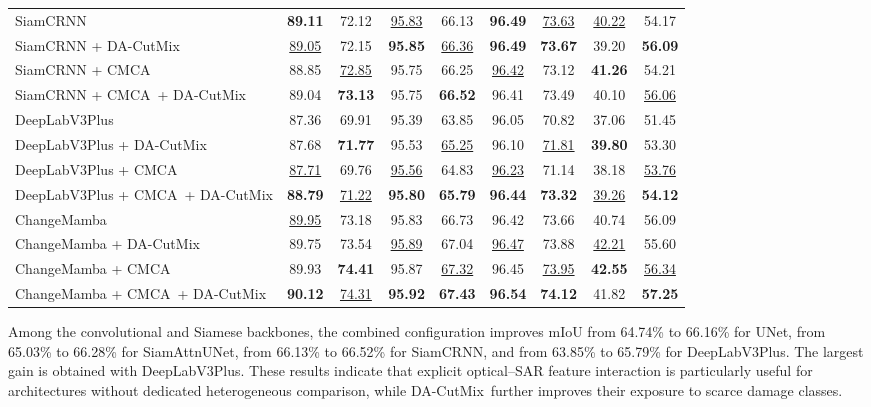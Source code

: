 \documentclass[journal]{IEEEtran}
\newcommand{\cmca}{CMCA}
\newcommand{\dacutmix}{DA-CutMix}
\begin{document}
\begin{table}[!t]
\begin{tabular}{lcccccccc}
    \midrule
    SiamCRNN & \textbf{89.11} & 72.12 & \underline{95.83} & 66.13 & \textbf{96.49} & \underline{73.63} & \underline{40.22} & 54.17 \\
    SiamCRNN + \dacutmix & \underline{89.05} & 72.15 & \textbf{95.85} & \underline{66.36} & \textbf{96.49} & \textbf{73.67} & 39.20 & \textbf{56.09} \\
    SiamCRNN + \cmca & 88.85 & \underline{72.85} & 95.75 & 66.25 & \underline{96.42} & 73.12 & \textbf{41.26} & 54.21 \\
    SiamCRNN + \cmca\ + \dacutmix & 89.04 & \textbf{73.13} & 95.75 & \textbf{66.52} & 96.41 & 73.49 & 40.10 & \underline{56.06} \\
    \midrule
    DeepLabV3Plus & 87.36 & 69.91 & 95.39 & 63.85 & 96.05 & 70.82 & 37.06 & 51.45 \\
    DeepLabV3Plus + \dacutmix & 87.68 & \textbf{71.77} & 95.53 & \underline{65.25} & 96.10 & \underline{71.81} & \textbf{39.80} & 53.30 \\
    DeepLabV3Plus + \cmca & \underline{87.71} & 69.76 & \underline{95.56} & 64.83 & \underline{96.23} & 71.14 & 38.18 & \underline{53.76} \\
    DeepLabV3Plus + \cmca\ + \dacutmix & \textbf{88.79} & \underline{71.22} & \textbf{95.80} & \textbf{65.79} & \textbf{96.44} & \textbf{73.32} & \underline{39.26} & \textbf{54.12} \\
    \midrule
    ChangeMamba & \underline{89.95} & 73.18 & 95.83 & 66.73 & 96.42 & 73.66 & 40.74 & 56.09 \\
    ChangeMamba + \dacutmix & 89.75 & 73.54 & \underline{95.89} & 67.04 & \underline{96.47} & 73.88 & \underline{42.21} & 55.60 \\
    ChangeMamba + \cmca & 89.93 & \textbf{74.41} & 95.87 & \underline{67.32} & 96.45 & \underline{73.95} & \textbf{42.55} & \underline{56.34} \\
    ChangeMamba + \cmca\ + \dacutmix & \textbf{90.12} & \underline{74.31} & \textbf{95.92} & \textbf{67.43} & \textbf{96.54} & \textbf{74.12} & 41.82 & \textbf{57.25} \\
    \bottomrule
    \end{tabular}
    \renewcommand{\arraystretch}{1.0}
    \end{table}
    
    
    Among the convolutional and Siamese backbones, the combined configuration improves mIoU from 64.74\% to 66.16\% for UNet, from 65.03\% to 66.28\% for SiamAttnUNet, from 66.13\% to 66.52\% for SiamCRNN, and from 63.85\% to 65.79\% for DeepLabV3Plus. The largest gain is obtained with DeepLabV3Plus. These results indicate that explicit optical--SAR feature interaction is particularly useful for architectures without dedicated heterogeneous comparison, while \dacutmix\ further improves their exposure to scarce damage classes.
    
\end{document}
